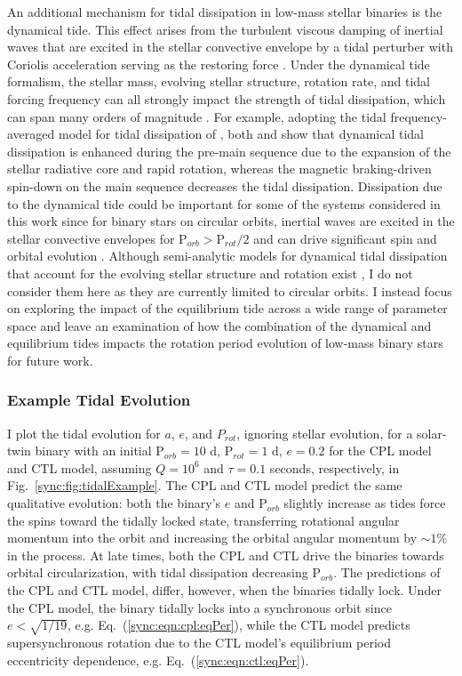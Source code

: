 An additional mechanism for tidal dissipation in low-mass stellar binaries is the dynamical tide. This effect arises from the turbulent viscous damping of inertial waves that are excited in the stellar convective envelope by a tidal perturber with Coriolis acceleration serving as the restoring force \citep{Zahn1975,Ogilvie2007}. Under the dynamical tide formalism, the stellar mass, evolving stellar structure, rotation rate, and tidal forcing frequency can all strongly impact the strength of tidal dissipation, which can span many orders of magnitude \citep{Ogilvie2007,Ogilvie2013,Mathis2015,Gallet2017}. For example, adopting the tidal frequency-averaged model for tidal dissipation of \citet{Ogilvie2013}, both \citet{Mathis2015} and \citet{Gallet2017} show that dynamical tidal dissipation is enhanced during the pre-main sequence due to the expansion of the stellar radiative core and rapid rotation, whereas the magnetic braking-driven spin-down on the main sequence decreases the tidal dissipation. Dissipation due to the dynamical tide could be important for some of the systems considered in this work since for binary stars on circular orbits, inertial waves are excited in the stellar convective envelopes for P$_{orb} > $P$_{rot}/2$ and can drive significant spin and orbital evolution \citep[e.g.][]{Witte2002,Ogilvie2007,Bolmont2016}. Although semi-analytic models for dynamical tidal dissipation that account for the evolving stellar structure and rotation exist \citep[e.g.][]{Mathis2015,Bolmont2016,Gallet2017}, I do not consider them here as they are currently limited to circular orbits. I instead focus on exploring the impact of the equilibrium tide across a wide range of parameter space and leave an examination of how the combination of the dynamical and equilibrium tides impacts the rotation period evolution of low-mass binary stars for future work.

\subsubsection{Example Tidal Evolution} \label{sync:sec:methods:eqtideExample}

I plot the tidal evolution for $a$, $e$, and $P_{rot}$, ignoring stellar evolution, for a solar-twin binary with an initial P$_{orb} = 10$ d, P$_{rot} = 1$ d, $e = 0.2$ for the CPL model and CTL model, assuming $Q=10^6$ and $\tau = 0.1$ seconds, respectively, in Fig.~\ref{sync:fig:tidalExample}. The CPL and CTL model predict the same qualitative evolution: both the binary's $e$ and P$_{orb}$ slightly increase as tides force the spins toward the tidally locked state, transferring rotational angular momentum into the orbit and increasing the orbital angular momentum by ${\sim}1\%$ in the process.  At late times, both the CPL and CTL drive the binaries towards orbital circularization, with tidal dissipation decreasing P$_{orb}$. The predictions of the CPL and CTL model, differ, however, when the binaries tidally lock.  Under the CPL model, the binary tidally locks into a synchronous orbit since $e < \sqrt{1/19}$, e.g. Eq.~(\ref{sync:eqn:cpl:eqPer}), while the CTL model predicts supersynchronous rotation due to the CTL model's equilibrium period eccentricity dependence, e.g. Eq.~(\ref{sync:eqn:ctl:eqPer}).

